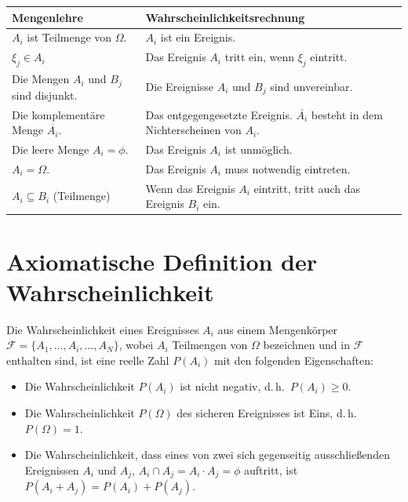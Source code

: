 \begin{center}
\begin{tabular}{p{5.5cm}|p{7.5cm}}
  \hline
  Mengenlehre & Wahrscheinlichkeitsrechnung \\
  \hline
  $A_i$ ist Teilmenge von $\Omega$. & $A_i$ ist ein Ereignis. \\
  $\xi_j \in A_i$ & Das Ereignis $A_i$ tritt ein, wenn $\xi_j$ eintritt. \\
  Die Mengen $A_i$ und $B_j$ sind disjunkt. & Die Ereignisse $A_i$ und $B_j$ sind unvereinbar. \\
  Die komplementäre Menge $\overline{A_i}$. & Das entgegengesetzte Ereignis. $\overline{A_i}$ besteht in dem Nichterscheinen von $A_i$. \\
  Die leere Menge $A_i = \phi$. & Das Ereignis $A_i$ ist unmöglich. \\
  $A_i = \Omega$. & Das Ereignis $A_i$ muss notwendig eintreten. \\
  $A_i \subseteq B_i$ (Teilmenge) & Wenn das Ereignis $A_i$ eintritt, tritt auch das Ereignis $B_i$ ein. \\
  \hline
\end{tabular}
\end{center}

\section{Axiomatische Definition der Wahrscheinlichkeit}
\label{sec:axiome-wahrscheinlichkeit}

\begin{definition}
Die Wahrscheinlichkeit eines Ereignisses $A_i$ aus einem Mengenkörper $\mathcal{F} = \{A_1, \ldots, A_i, \ldots, A_N\}$, wobei $A_i$ Teilmengen von $\Omega$ bezeichnen und in $\mathcal{F}$ enthalten sind, ist eine reelle Zahl $P(A_i)$ mit den folgenden Eigenschaften:

\begin{itemize}
  \item Die Wahrscheinlichkeit $P(A_i)$ ist nicht negativ, d.\,h.\ $P(A_i) \geq 0$.
  \item Die Wahrscheinlichkeit $P(\Omega)$ des sicheren Ereignisses ist Eins, d.\,h.\ $P(\Omega) = 1$.
  \item Die Wahrscheinlichkeit, dass eines von zwei sich gegenseitig ausschließenden Ereignissen $A_i$ und $A_j$, $A_i \cap A_j = A_i \cdot A_j = \phi$ auftritt, ist $P(A_i + A_j) = P(A_i) + P(A_j)$.
\end{itemize}
\end{definition}

